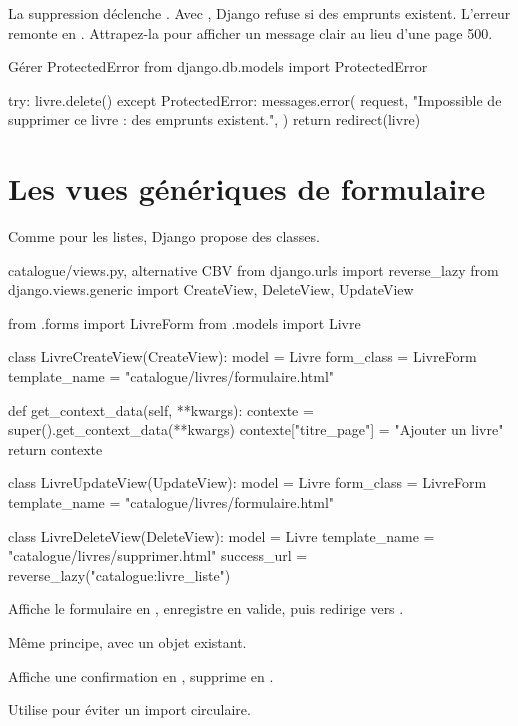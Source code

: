 \begin{attention}
La suppression déclenche . Avec , Django refuse si
des emprunts existent. L'erreur remonte en . Attrapez-la pour
afficher un message clair au lieu d'une page 500.
\end{attention}

\begin{codebox}[python]{Gérer ProtectedError}
from django.db.models import ProtectedError

try:
    livre.delete()
except ProtectedError:
    messages.error(
        request,
        "Impossible de supprimer ce livre : des emprunts existent.",
    )
    return redirect(livre)
\end{codebox}

\section{Les vues génériques de formulaire}

Comme pour les listes, Django propose des classes.

\begin{codebox}[python]{catalogue/views.py, alternative CBV}
from django.urls import reverse_lazy
from django.views.generic import CreateView, DeleteView, UpdateView

from .forms import LivreForm
from .models import Livre


class LivreCreateView(CreateView):
    model = Livre
    form_class = LivreForm
    template_name = "catalogue/livres/formulaire.html"

    def get_context_data(self, **kwargs):
        contexte = super().get_context_data(**kwargs)
        contexte["titre_page"] = "Ajouter un livre"
        return contexte


class LivreUpdateView(UpdateView):
    model = Livre
    form_class = LivreForm
    template_name = "catalogue/livres/formulaire.html"


class LivreDeleteView(DeleteView):
    model = Livre
    template_name = "catalogue/livres/supprimer.html"
    success_url = reverse_lazy("catalogue:livre_liste")
\end{codebox}

\begin{description}[leftmargin=4.4cm,style=nextline]
  \item[\code{CreateView}] Affiche le formulaire en , enregistre en
   valide, puis redirige vers .
  \item[\code{UpdateView}] Même principe, avec un objet existant.
  \item[\code{DeleteView}] Affiche une confirmation en , supprime en
  .
  \item[\code{success\_url}] Utilise  pour éviter un import
  circulaire.
\end{description}

